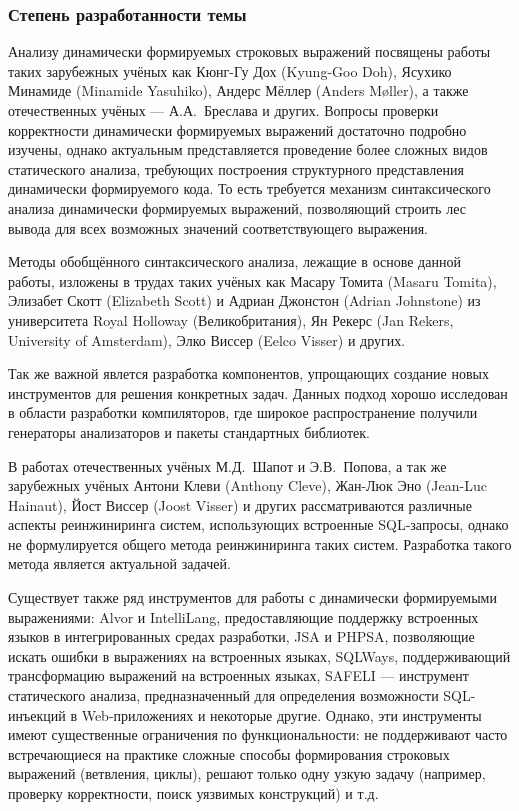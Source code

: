 \subsubsection*{\large{Степень разработанности темы}}

Анализу динамически формируемых строковых выражений посвящены работы таких зарубежных учёных как Кюнг-Гу Дох (Kyung-Goo Doh), Ясухико Минамиде (Minamide Yasuhiko), Андерс Мёллер (Anders M{\o}ller), а также отечественных учёных --- А.А.~Бреслава и других. Вопросы проверки корректности динамически формируемых выражений достаточно подробно изучены, однако актуальным представляется проведение более сложных видов статического анализа, требующих построения структурного представления динамически формируемого кода. То есть требуется механизм синтаксического анализа динамически формируемых выражений, позволяющий строить лес вывода для всех возможных значений соответствующего выражения. 

Методы обобщённого синтаксического анализа, лежащие в основе данной работы, изложены в трудах таких учёных как Масару Томита (Masaru Tomita), Элизабет Скотт (Elizabeth Scott) и Адриан Джонстон (Adrian Johnstone) из университета Royal Holloway (Великобритания), Ян Рекерс (Jan Rekers, University of Amsterdam), Элко Виссер (Eelco Visser) и других.

Так же важной явлется разработка компонентов, упрощающих создание новых инструментов для решения конкретных задач. Данных подход хорошо исследован в области разработки компиляторов, где широкое распространение получили генераторы анализаторов и пакеты стандартных библиотек. 

В работах отечественных учёных М.Д.~Шапот  и Э.В.~Попова, а так же зарубежных учёных Антони Клеви (Anthony Cleve), Жан-Люк Эно (Jean-Luc Hainaut), Йост Виссер (Joost Visser) и других рассматриваются различные аспекты реинжиниринга систем, использующих встроенные SQL-запросы, однако не формулируется общего метода реинжиниринга таких систем. Разработка такого метода является актуальной задачей.

Существует также ряд инструментов для работы с динамически формируемыми выражениями: Alvor и IntelliLang, предоставляющие поддержку встроенных языков в интегрированных средах разработки, JSA и PHPSA, позволяющие искать ошибки в выражениях на встроенных языках, SQLWays, поддерживающий трансформацию выражений на встроенных языках, SAFELI --- инструмент статического анализа, предназначенный для определения возможности SQL-инъекций в Web-приложениях и некоторые другие. Однако, эти инструменты имеют существенные ограничения по функциональности: не поддерживают часто встречающиеся на практике сложные способы формирования строковых выражений (ветвления, циклы), решают только одну узкую задачу (например, проверку корректности, поиск уязвимых конструкций) и т.д.

